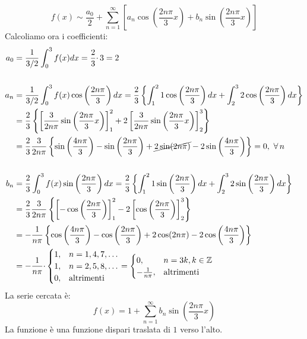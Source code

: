 \begin{equation*}
f( x) \sim \frac{a_{0}}{2} +\sum\limits ^{\infty }_{n=1}\left[ a_{n}\cos\left(\frac{2n\pi }{3} x\right) +b_{n}\sin\left(\frac{2n\pi }{3} x\right)\right]
\end{equation*}
Calcoliamo ora i coefficienti:
\begin{align*}
a_{0} & =\frac{1}{3/2}\int ^{3}_{0} f(x)dx=\frac{2}{3} \cdotp 3=2\\
 & \\
a_{n} & =\frac{1}{3/2}\int ^{3}_{0} f(x)\cos\left(\frac{2n\pi }{3}\right) dx=\frac{2}{3}\left\{\int ^{2}_{1} 1\cos\left(\frac{2n\pi }{3}\right) dx+\int ^{3}_{2} 2\cos\left(\frac{2n\pi }{3}\right) dx\right\}\\
 & =\frac{2}{3}\left\{\left[\frac{3}{2n\pi }\sin\left(\frac{2n\pi }{3} x\right)\right]^{2}_{1} +2\left[\frac{3}{2n\pi }\sin\left(\frac{2n\pi }{3} x\right)\right]^{3}_{2}\right\}\\
 & =\frac{2}{3}\frac{3}{2n\pi }\left\{\sin\left(\frac{4n\pi }{3}\right) -\sin\left(\frac{2n\pi }{3}\right) +\cancel{2\sin( 2n\pi )} -2\sin\left(\frac{4n\pi }{3}\right)\right\} =0,\ \forall n\\
 & \\
b_{n} & =\frac{2}{3}\int ^{3}_{0} f(x)\sin\left(\frac{2n\pi }{3}\right) dx=\frac{2}{3}\left\{\int ^{2}_{1} 1\sin\left(\frac{2n\pi }{3}\right) dx+\int ^{3}_{2} 2\sin\left(\frac{2n\pi }{3}\right) dx\right\}\\
 & =\frac{2}{3}\frac{3}{2n\pi }\left\{\left[ -\cos\left(\frac{2n\pi }{3}\right)\right]^{2}_{1} -2\left[\cos\left(\frac{2n\pi }{3}\right)\right]^{3}_{2}\right\}\\
 & =-\frac{1}{n\pi }\left\{\cos\left(\frac{4n\pi }{3}\right) -\cos\left(\frac{2n\pi }{3}\right) +2\cos( 2n\pi ) -2\cos\left(\frac{4n\pi }{3}\right)\right\}\\
 & =-\frac{1}{n\pi } \cdotp \begin{cases}
1, & n=1,4,7,\dotsc \\
1, & n=2,5,8,\dotsc \\
0, & \text{altrimenti}
\end{cases} =\begin{cases}
0, & n=3k,k\in \ZZ \\
-\frac{1}{n\pi } , & \text{altrimenti}
\end{cases}
\end{align*}
La serie cercata è:
\begin{equation*}
f(x)=1+\sum ^{\infty }_{n=1} b_{n}\sin\left(\frac{2n\pi }{3} x\right)
\end{equation*}
La funzione è una funzione dispari traslata di $1$ verso l'alto.
\Soluzione

